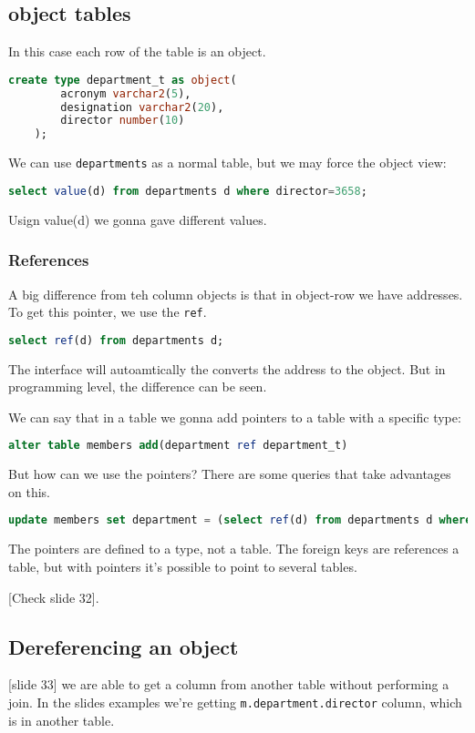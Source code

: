 \subsection{object tables} 

In this case each row of the table is an object. 

\begin{lstlisting}[language=sql]
    create type department_t as object(
        acronym varchar2(5), 
        designation varchar2(20),
        director number(10)
    );
\end{lstlisting} 

We can use \texttt{departments} as a normal table, but we may force the object view:

\begin{lstlisting}[language=sql]
    select value(d) from departments d where director=3658;
\end{lstlisting} 

Usign value(d) we gonna gave different values. 

\subsubsection{References} 

A big difference from teh column objects is that in object-row we have addresses. To get this pointer, we use the \texttt{ref}. 

\begin{lstlisting}[language=sql]
    select ref(d) from departments d; 
\end{lstlisting}  

The interface will autoamtically the converts the address to the object. But in programming level, the difference can be seen. 

We can say that in a table we gonna add pointers to a table with a specific type:
\begin{lstlisting}[language=sql]
    alter table members add(department ref department_t)
\end{lstlisting} 

But how can we use the pointers? There are some queries that take advantages on this. 

\begin{lstlisting}[language=sql]
    update members set department = (select ref(d) from departments d where sigla='CLU' where id=3658)
\end{lstlisting}  

The pointers are defined to a type, not a table. The foreign keys are references a table, but with pointers it's possible to point to several tables.  

[Check slide 32].  

\subsection{Dereferencing an object} 
[slide 33] we are able to get a column from another table without performing a join. In the slides examples we're getting \texttt{m.department.director} column, which is in another table. 

